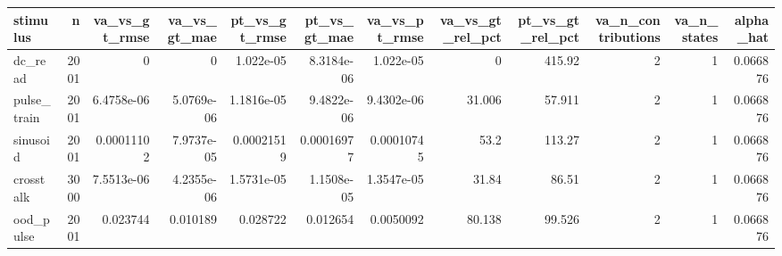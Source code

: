 \begin{tabular}{lrrrrrrrrrrr}
\toprule
stimulus & n & va_vs_gt_rmse & va_vs_gt_mae & pt_vs_gt_rmse & pt_vs_gt_mae & va_vs_pt_rmse & va_vs_gt_rel_pct & pt_vs_gt_rel_pct & va_n_contributions & va_n_states & alpha_hat \\
\midrule
dc_read & 2001 & 0 & 0 & 1.022e-05 & 8.3184e-06 & 1.022e-05 & 0 & 415.92 & 2 & 1 & 0.066876 \\
pulse_train & 2001 & 6.4758e-06 & 5.0769e-06 & 1.1816e-05 & 9.4822e-06 & 9.4302e-06 & 31.006 & 57.911 & 2 & 1 & 0.066876 \\
sinusoid & 2001 & 0.00011102 & 7.9737e-05 & 0.00021519 & 0.00016977 & 0.00010745 & 53.2 & 113.27 & 2 & 1 & 0.066876 \\
crosstalk & 3000 & 7.5513e-06 & 4.2355e-06 & 1.5731e-05 & 1.1508e-05 & 1.3547e-05 & 31.84 & 86.51 & 2 & 1 & 0.066876 \\
ood_pulse & 2001 & 0.023744 & 0.010189 & 0.028722 & 0.012654 & 0.0050092 & 80.138 & 99.526 & 2 & 1 & 0.066876 \\
\bottomrule
\end{tabular}
